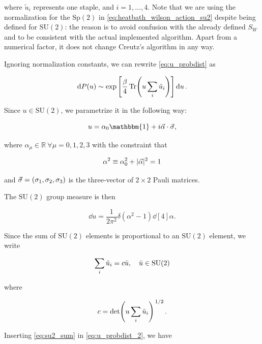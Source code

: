 \documentclass[reqno,12pt]{article}
\numberwithin{equation}{section}
\newcommand{\SU}{\mathrm{SU}}
\newcommand{\Sp}{\mathrm{Sp}}
\newcommand{\id}{\mathbbm{1}}
\begin{document}
where $\tilde{u}_i$ represents one staple, and $i = 1, \dots, 4$. Note that we are
using the normalization for the $\Sp(2)$ in \eqref{eq:heatbath_wilson_action_su2} despite being defined for
$\SU(2)$: the reason is to avoid confusion with the already defined $S_W$ and to be consistent with the actual implemented
algorithm. Apart from a numerical factor, it does not change Creutz's algorithm in any way. 

Ignoring normalization constants, we can rewrite \eqref{eq:u_probdist} as

\begin{equation} \label{eq:u_probdist_2}
	\dd{P(u)} \sim \exp\qty[\frac{\beta}{4} \Tr(u \sum_i \tilde{u}_i)] \dd{u}.
\end{equation}

Since $u \in \SU(2)$, we parametrize it in the following way:

\begin{equation} \label{eq:su2parametrization}
	u = \alpha_0 \id + i \va{\alpha} \cdot \va{\sigma},
\end{equation}

where $\alpha_\mu \in \mathbb{R} \ \forall \mu = 0, 1, 2, 3$ with the constraint that 

\begin{equation}
	\alpha^2 \equiv \alpha_0^2 + |\va{\alpha}|^2 = 1
\end{equation} 

and $\va{\sigma} = \qty(\sigma_1, \sigma_2, \sigma_3)$ is the three-vector of $2 \times 2$ Pauli matrices. 

The $\SU(2)$ group measure is then

\begin{equation} \label{eq:su2_group_measure}
	\dd{u} = \frac{1}{2\pi^2} \delta(\alpha^2 - 1) \dd[4]{\alpha}.
\end{equation}

Since the sum of $\SU(2)$ elements is proportional to an $\SU(2)$ element, we write

\begin{equation} \label{eq:su2_sum}
	\sum_i \tilde{u}_i = c \bar{u} \qc \bar{u} \in \SU(2)
\end{equation}

where 

\begin{equation}
	c = \det(u \sum_i \tilde{u}_i)^{\flatfrac{1}{2}}.
\end{equation}

Inserting \eqref{eq:su2_sum} in \eqref{eq:u_probdist_2}, we have
\end{document}
